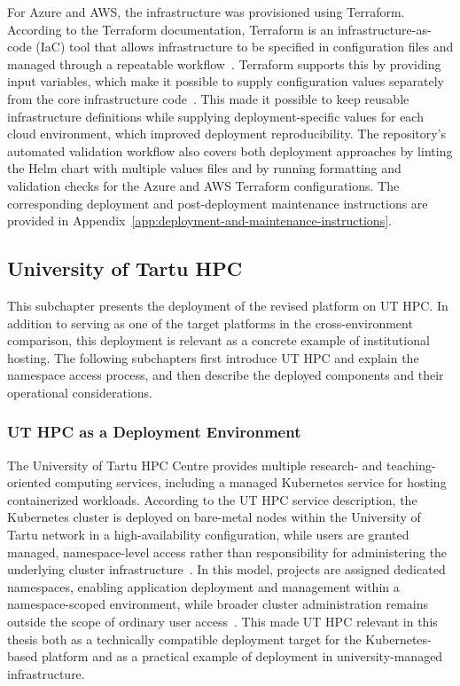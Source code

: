 For Azure and AWS, the infrastructure was provisioned using Terraform.
According to the Terraform documentation, Terraform is an infrastructure-as-code (IaC) tool that allows infrastructure to be specified in configuration files and managed through a repeatable workflow~\cite{hashicorp_terraform_intro}.
Terraform supports this by providing input variables, which make it possible to supply configuration values separately from the core infrastructure code~\cite{hashicorp_terraform_input_variables}.
This made it possible to keep reusable infrastructure definitions while supplying deployment-specific values for each cloud environment, which improved deployment reproducibility.
The repository's automated validation workflow also covers both deployment approaches by linting the Helm chart with multiple values files and by running formatting and validation checks for the Azure and AWS Terraform configurations.
The corresponding deployment and post-deployment maintenance instructions are provided in Appendix~\ref{app:deployment-and-maintenance-instructions}.

\subsection{University of Tartu HPC} \label{subsec:university-of-tartu-hpc}
This subchapter presents the deployment of the revised platform on UT HPC\@.
In addition to serving as one of the target platforms in the cross-environment comparison, this deployment is relevant as a concrete example of institutional hosting.
The following subchapters first introduce UT HPC and explain the namespace access process, and then describe the deployed components and their operational considerations.

\subsubsection{UT HPC as a Deployment Environment} \label{subsubsec:ut-hpc-as-a-deployment-environment}
The University of Tartu HPC Centre provides multiple research- and teaching-oriented computing services, including a managed Kubernetes service for hosting containerized workloads.
According to the UT HPC service description, the Kubernetes cluster is deployed on bare-metal nodes within the University of Tartu network in a high-availability configuration, while users are granted managed, namespace-level access rather than responsibility for administering the underlying cluster infrastructure~\cite{ut_hpc_kubernetes}.
In this model, projects are assigned dedicated namespaces, enabling application deployment and management within a namespace-scoped environment, while broader cluster administration remains outside the scope of ordinary user access~\cite{ut_hpc_kubernetes_quick_start_2026}.
This made UT HPC relevant in this thesis both as a technically compatible deployment target for the Kubernetes-based platform and as a practical example of deployment in university-managed infrastructure.

